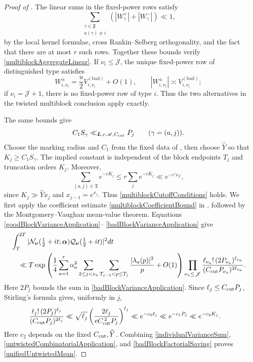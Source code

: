 \documentclass[oneside, 12pt]{amsart}
\theoremstyle{definition}
\begin{document}
{\begin{proof}[Proof of ]
			The linear sums in the fixed-power rows satisfy
			\[
			\sum_{\substack{\gamma\in\mathfrak F\\a(\gamma)\neq i}}
			(|W_\gamma^+|+|W_\gamma^-|)\ll1,
			\]
			by the local kernel formulae, cross Rankin--Selberg orthogonality, and
			the fact that there are at most $r$ such rows. Together these bounds
			verify \eqref{multiblockAggregateLinear}. If
			$\nu_i\leq\mathscr J$, the unique fixed-power row of distinguished type
			satisfies
			\[
			W_{i,\nu_i}^{\pm}
			=\frac{u}{2}V_{i,\nu_i}^{(\mathrm{bad})}+O(1),
			\qquad
			|W_{i,\nu_i}^{\pm}|\asymp V_{i,\nu_i}^{(\mathrm{bad})};
			\]
			if $\nu_i=\mathscr J+1$, there is no fixed-power row of type $i$.
			Thus the two alternatives in the twisted multiblock conclusion apply
			exactly.
			
			The same bounds give
			\begin{equation}\label{kernelCutoffScale}
				C_1S_\gamma\ll_{\boldsymbol L,r,\mathscr A,C_{\rm cut}}P_j
				\qquad(\gamma=(a,j)).
			\end{equation}
			Choose the marking radius and $C_1$ from the fixed data of
			, then choose $\widehat Y$ so that
			$K_j\geq C_1S_\gamma$.  The implied constant is independent of
			the block endpoints $T_j$ and truncation orders $K_j$.  Moreover,
			\[
			\sum_{(a,j)\in\mathfrak T}e^{-cK_j}
			\leq r\sum_j e^{-cK_j}\ll e^{-c'x_{\mathscr J}},
			\]
			since $K_j\gg\widehat Yx_j$ and $x_{j-1}=e^{x_j}$.
			Thus \eqref{multiblockCutoffConditions} holds.
			We first apply the coefficient estimate
			\eqref{multiblockCoefficientBound} in
			, followed by the
			Montgomery--Vaughan mean-value theorem.  Equations
			\eqref{goodBlockVarianceApplication}--
			\eqref{badBlockVarianceApplication} give
			\begin{align}
				&\int_T^{2T}
				|\mathcal N_{\boldsymbol\nu}(\tfrac12+it;\boldsymbol\alpha)
				\mathcal Q_{\boldsymbol\nu}(\tfrac12+it)|^2dt\nonumber\\
				&\quad\ll T
				\exp\left(\frac14\sum_{a=1}^r\alpha_a^2
				\sum_{2\leq j<\nu_a}
				\sum_{T_{j-1}<p\leq T_j}
				\frac{|\lambda_a(p)|^2}{p}+O(1)\right)
				\prod_{\nu_a\leq\mathscr J}
				\frac{\ell_{\nu_a}!\,(2P_{\nu_a})^{\ell_{\nu_a}}}
				{(C_{\rm cut}P_{\nu_a})^{2\ell_{\nu_a}}}.
				\label{untwistedCombinatorialApplication}
			\end{align}
			Here $2P_j$ bounds the sum in
			\eqref{badBlockVarianceApplication}.  Since $\ell_j\leq C_{\rm cut}P_j$, Stirling's
			formula gives, uniformly in $j$,
			\begin{align}
				\frac{\ell_j!\,(2P_j)^{\ell_j}}{(C_{\rm cut}P_j)^{2\ell_j}}
				&\ll \sqrt{\ell_j}
				\left(\frac{2\ell_j}{eC_{\rm cut}^{\,2}P_j}\right)^{\ell_j}
				\ll e^{-c_0\ell_j}
				\ll e^{-c_1P_j}
				\ll e^{-c_2K_j}.
				\label{badBlockFactorialSaving}
			\end{align}
			Here $c_2$ depends on the fixed $C_{\rm cut},\widehat Y$.
			Combining
			\eqref{individualVarianceSum},
			\eqref{untwistedCombinatorialApplication}, and
			\eqref{badBlockFactorialSaving} proves
			\eqref{unifiedUntwistedMean}.
			

\end{proof}}
\end{document}
